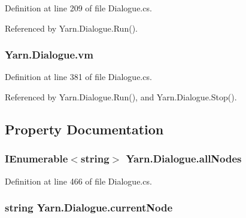 Definition at line 209 of file Dialogue.\-cs.



Referenced by Yarn.\-Dialogue.\-Run().

\hypertarget{a00092_a8c1319357a9df6cff051328fb33224c7}{
\subsubsection[{vm}]{ Yarn.\-Dialogue.\-vm\hspace{0.3cm}{\ttfamily [private]}}}\label{a00092_a8c1319357a9df6cff051328fb33224c7}


Definition at line 381 of file Dialogue.\-cs.



Referenced by Yarn.\-Dialogue.\-Run(), and Yarn.\-Dialogue.\-Stop().



\subsection{Property Documentation}
\hypertarget{a00092_a0ee573e3d072bccf98ba1d975612d42c}{
\subsubsection[{all\-Nodes}]{\setlength{\rightskip}{0pt plus 5cm}I\-Enumerable$<$string$>$ Yarn.\-Dialogue.\-all\-Nodes\hspace{0.3cm}{\ttfamily [get]}}}\label{a00092_a0ee573e3d072bccf98ba1d975612d42c}


Definition at line 466 of file Dialogue.\-cs.

\hypertarget{a00092_af368b5c342d585dc6953876c5965ccc8}{
\subsubsection[{current\-Node}]{\setlength{\rightskip}{0pt plus 5cm}string Yarn.\-Dialogue.\-current\-Node\hspace{0.3cm}{\ttfamily [get]}}}\label{a00092_af368b5c342d585dc6953876c5965ccc8}


